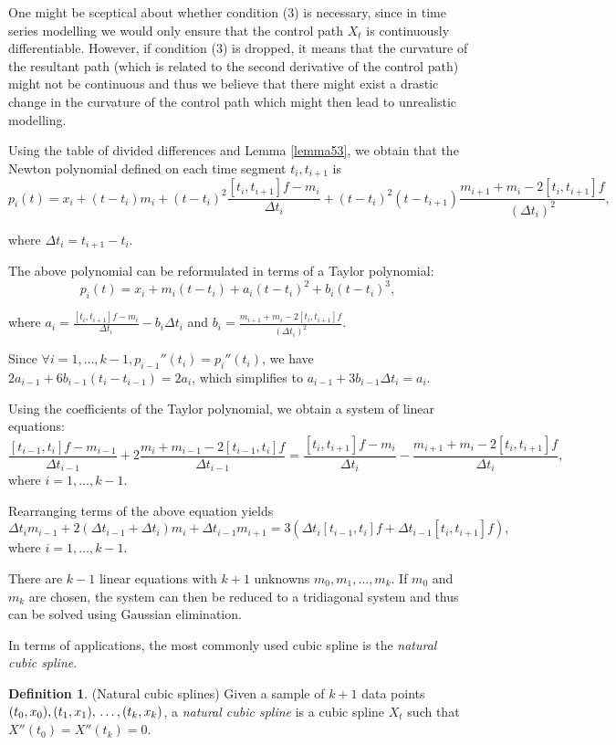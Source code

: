 \documentclass[a4paper,11pt,titlepage]{article}
\theoremstyle{definition}
\newtheorem{definition}{Definition}[section]
\theoremstyle{plain}
\theoremstyle{remark}
\begin{document}
One might be sceptical about whether condition (3) is necessary, since in time series modelling we would only ensure that the control path $X_t$ is continuously differentiable. However, if condition (3) is dropped, it means that the curvature of the resultant path (which is related to the second derivative of the control path) might not be continuous and thus we believe that there might exist a drastic change in the curvature of the control path which might then lead to unrealistic modelling.

Using the table of divided differences and Lemma \ref{lemma53}, we obtain that the Newton polynomial defined on each time segment $t_i,t_{i+1}$ is
$$p_i(t)=x_i+(t-t_i)m_i+(t-t_i)^2\frac{[t_i,t_{i+1}]f-m_i}{\Delta t_i}+(t-t_i)^2(t-t_{i+1})\frac{m_{i+1}+m_i-2[t_i,t_{i+1}]f}{(\Delta t_i)^2},$$

where $\Delta t_i=t_{i+1}-t_i$.

The above polynomial can be reformulated in terms of a Taylor polynomial:
$$p_i(t)=x_i+m_i(t-t_i)+a_i(t-t_i)^2+b_i(t-t_i)^3,$$

where $\displaystyle a_i=\frac{[t_i,t_{i+1}]f-m_i}{\Delta t_i}-b_i\Delta t_i$ and $\displaystyle b_i=\frac{m_{i+1}+m_i-2[t_i,t_{i+1}]f}{(\Delta t_i)^2}$.

Since $\forall i=1,\dots,k-1, p_{i-1}''(t_i)=p_i''(t_i)$, we have $2a_{i-1}+6b_{i-1}(t_i-t_{i-1})=2a_i$, which simplifies to $a_{i-1}+3b_{i-1}\Delta t_i=a_i$.

Using the coefficients of the Taylor polynomial, we obtain a system of linear equations:
$$\frac{[t_{i-1},t_i]f-m_{i-1}}{\Delta t_{i-1}}+2\frac{m_i+m_{i-1}-2[t_{i-1},t_i]f}{\Delta t_{i-1}}=\frac{[t_i,t_{i+1}]f-m_i}{\Delta t_{i}}-\frac{m_{i+1}+m_{i}-2[t_{i},t_{i+1}]f}{\Delta t_{i}},$$
where $i=1,\dots,k-1$.

Rearranging terms of the above equation yields
$$\Delta t_im_{i-1}+2(\Delta t_{i-1}+\Delta t_i)m_i+\Delta t_{i-1}m_{i+1}=3(\Delta t_i[t_{i-1},t_i]f+\Delta t_{i-1}[t_i,t_{i+1}]f),$$
where $i=1,\dots,k-1$.

There are $k-1$ linear equations with $k+1$ unknowns $m_0,m_1,\dots,m_k$. If $m_0$ and $m_k$ are chosen, the system can then be reduced to a tridiagonal system and thus can be solved using Gaussian elimination.

In terms of applications, the most commonly used cubic spline is the \textit{natural cubic spline}.
\begin{definition}
    (Natural cubic splines) Given a sample of $k+1$ data points
$(t_0,x_0), (t_1,x_1), \\\dots, (t_k,x_k)$, a \textit{natural cubic spline} is a cubic spline $X_t$ such that $X''(t_0)=X''(t_k)=0$.
\end{definition}
\end{document}
